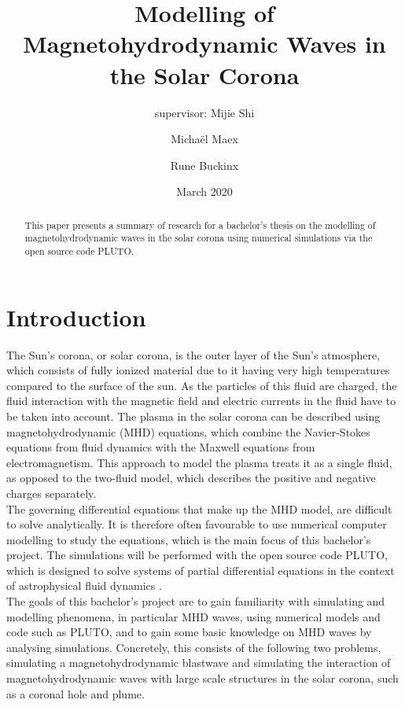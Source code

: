 \documentclass[a4paper]{article}
\title{Modelling of Magnetohydrodynamic Waves in the Solar Corona}
\author{supervisor: Mijie Shi \and Micha\"el Maex \and Rune Buckinx }
\date{March 2020}
\numberwithin{figure}{section}
\numberwithin{equation}{section}
\begin{document}
\maketitle

\begin{abstract}
    This paper presents a summary of research for a bachelor's thesis on the modelling of magnetohydrodynamic waves in the solar corona using numerical simulations via the open source code PLUTO. 
\end{abstract}
\newpage
\tableofcontents

\pagebreak

\listoffigures

\listoftodos

\newpage
{}
\section{Introduction} \label{sec:introduction}
The Sun's corona, or solar corona, is the outer layer of the Sun's atmosphere, which consists of fully ionized material due to it having very high temperatures compared to the surface of the sun. 
As the particles of this fluid are charged, the fluid interaction with the magnetic field and electric currents in the fluid have to be taken into account.  
The plasma in the solar corona can be described using magnetohydrodynamic (MHD) equations, which combine the Navier-Stokes equations from fluid dynamics with the Maxwell equations from electromagnetism. 
This approach to model the plasma treats it as a single fluid, as opposed to the two-fluid model, which describes the positive and negative charges separately. \\

The governing differential equations that make up the MHD model, are difficult to solve analytically. 
It is therefore often favourable to use numerical computer modelling to study the equations, which is the main focus of this bachelor's project. 
The simulations will be performed with the open source code PLUTO, which is designed to solve systems of partial differential equations in the context of astrophysical fluid dynamics \cite{mignone2011pluto}.\\

The goals of this bachelor's project are to gain familiarity with simulating and modelling phenomena, in particular MHD waves, using numerical models and code such as PLUTO, and to gain some basic knowledge on MHD waves by analysing simulations. Concretely, this consists of the following two problems, simulating a magnetohydrodynamic blastwave and simulating the interaction of magnetohydrodynamic waves with large scale structures in the solar corona, such as a coronal hole and plume.
\end{document}
